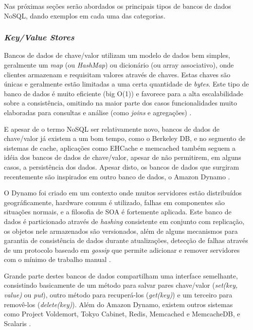 \documentclass[diss]{template/setrem}
\begin{document}
Nas próximas seções serão abordados os principais tipos de bancos de dados NoSQL, dando exemplos em cada uma das categorias.

\subsubsection{\textit{Key/Value Stores}}
Bancos de dados de chave/valor utilizam um modelo de dados bem simples, geralmente um \emph{map} (ou \emph{HashMap}) ou dicionário (ou array associativo), onde clientes armazenam e requisitam valores através de chaves. Estas chaves são únicas e geralmente estão limitadas a uma certa quantidade de \emph{bytes}. Este tipo de banco de dados é muito eficiente (big O(1)) e favorece para a alta escalabilidade sobre a consistência, omitindo na maior parte dos casos funcionalidades muito elaboradas para consultas e análise (como \emph{joins} e agregações) \citep{Tiwari2011, Strauch2011}.

E apesar de o termo NoSQL ser relativamente novo, bancos de dados de chave/valor já existem a um bom tempo, como o Berkeley DB, e no segmento de sistemas de cache, aplicações como EHCache e memcached também seguem a idéia dos bancos de dados de chave/valor, apesar de não permitirem, em alguns casos, a persistência dos dados. Apesar disto, os bancos de dados que surgiram recentemente são inspirados em outro banco de dados, o Amazon Dynamo \citep{Strauch2011}.

O Dynamo foi criado em um contexto onde muitos servidores estão distribuídos geográficamente, hardware comum é utilizado, falhas em componentes são situações normais, e a filosofia de SOA é fortemente aplicada. Este banco de dados é particionado através de \emph{hashing} consistente em conjunto com replicação, os objetos nele armazenados são versionados, além de alguns mecanismos para garantia de consistência de dados durante atualizações, detecção de falhas através de um protocolo baseado em \emph{gossip} que permite adicionar e remover servidores com o mínimo de trabalho manual \citep{Strauch2011}.

Grande parte destes bancos de dados compartilham uma interface semelhante, consistindo basicamente de um método para salvar pares chave/valor (\emph{set(key, value)} ou \emph{put}), outro método para recuperá-los (\emph{get(key)}) e um terceiro para removê-los (\emph{delete(key)}). Além do Amazon Dynamo, existem outros sistemas como Project Voldemort, Tokyo Cabinet, Redis, Memcached e MemcacheDB, e Scalaris \citep{Strauch2011}.
\end{document}
